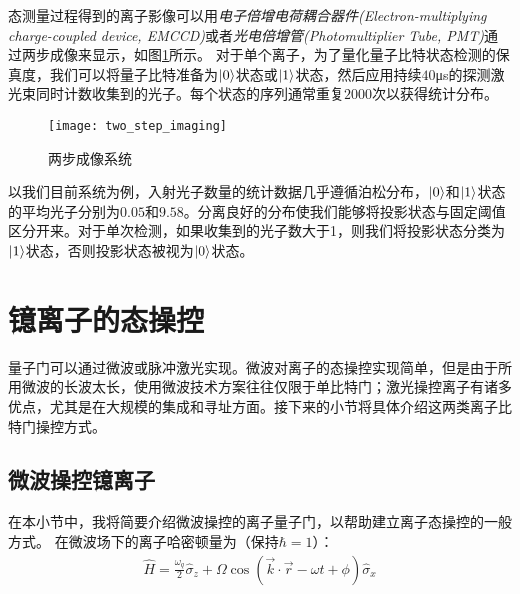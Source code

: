 态测量过程得到的离子影像可以用\emph{电子倍增电荷耦合器件(Electron-multiplying charge-coupled device, EMCCD)}或者\emph{光电倍增管(Photomultiplier Tube, PMT)}通过两步成像来显示，如图\ref{fig:two_step_imaging}所示。
对于单个离子，为了量化量子比特状态检测的保真度，我们可以将量子比特准备为$\ket{0}$状态或$\ket{1}$状态，然后应用持续$40$μs的探测激光束同时计数收集到的光子。每个状态的序列通常重复$2000$次以获得统计分布。

\begin{figure}
    \centering
    \caption[两步成像系统]{两步成像系统\label{fig:two_step_imaging}}
    \texttt{[image: two\_step\_imaging]}
\end{figure}

以我们目前系统为例，入射光子数量的统计数据几乎遵循泊松分布，$\ket{0}$和$\ket{1}$状态的平均光子分别为$0.05$和$9.58$。分离良好的分布使我们能够将投影状态与固定阈值区分开来。对于单次检测，如果收集到的光子数大于1，则我们将投影状态分类为$\ket{1}$状态，否则投影状态被视为$\ket{0}$状态。

\section[镱离子的态操控]{镱离子的态操控\label{section:yb_state_manipulation}}
量子门可以通过微波\cite[]{Olmschenk_Younge_Moehring_Matsukevich_Maunz_Monroe_2007}或脉冲激光\cite[]{Lee_2005}实现。微波对离子的态操控实现简单，但是由于所用微波的长波太长，使用微波技术方案往往仅限于单比特门；激光操控离子有诸多优点，尤其是在大规模的集成和寻址方面。接下来的小节将具体介绍这两类离子比特门操控方式。
\subsection[微波操控镱离子]{微波操控镱离子\label{section:microwave_operation}}
在本小节中，我将简要介绍微波操控的离子量子门，以帮助建立离子态操控的一般方式。
在微波场下的离子哈密顿量为（保持$\hbar=1$）：
\begin{align}
    \hat{H}=\frac{\omega_q}{2}\hat{\sigma}_z + \Omega\cos\left(\vec{k}\cdot\vec{r}-\omega t + \phi\right)\hat{\sigma}_x
\end{align}

